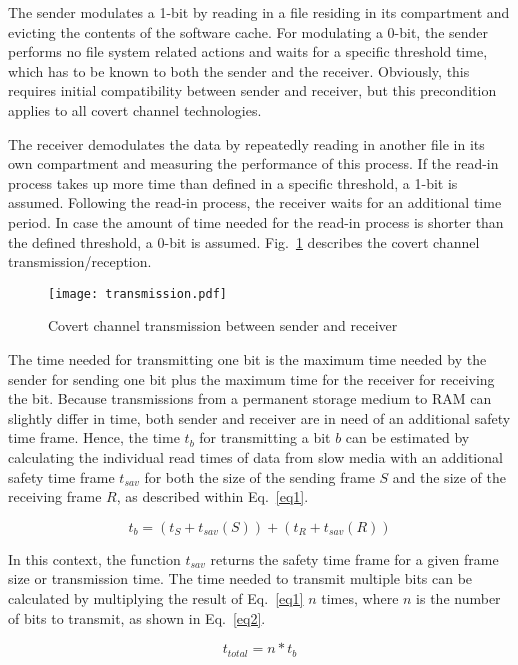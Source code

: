 \documentclass[runningheads,a4paper]{llncs}
\begin{document}
The sender modulates a 1-bit by reading in a file residing in its compartment and evicting the contents of the software cache.
For modulating a 0-bit, the sender performs no file system related actions and waits for a specific threshold time, which has to be known to both the sender and the receiver.
Obviously, this requires initial compatibility between sender and receiver, but this precondition applies to all covert channel technologies.

The receiver demodulates the data by repeatedly reading in another file in its own compartment and measuring the performance of this process.
If the read-in process takes up more time than defined in a specific threshold, a 1-bit is assumed.
Following the read-in process, the receiver waits for an additional time period.
In case the amount of time needed for the read-in process is shorter than the defined threshold, a 0-bit is assumed.
Fig.~\ref{transmission} describes the covert channel transmission/reception.

\begin{figure}[!ht]
\texttt{[image: transmission.pdf]}
\caption{Covert channel transmission between sender and receiver}
\label{transmission}
\end{figure}

The time needed for transmitting one bit is the maximum time needed by the sender for sending one bit plus the maximum time for the receiver for receiving the bit. 
Because transmissions from a permanent storage medium to RAM can slightly differ in time, both sender and receiver are in need of an additional safety time frame. 
Hence, the time $t_b$ for transmitting a bit $b$ can be estimated by calculating the individual read times of data from slow media with an additional safety time frame $t_{sav}$ for both the size of the sending frame $S$ and the size of the receiving frame $R$, as described within Eq.~\ref{eq1}.

\begin{equation}\label{eq1}
t_{b} = \left(t_{S}+t_{sav}(S)\right) + \left(t_{R}+t_{sav}(R)\right)
\end{equation}

In this context, the function $t_{sav}$ returns the safety time frame for a given frame size or transmission time.
The time needed to transmit multiple bits can be calculated by multiplying the result of Eq.~\ref{eq1} $n$ times, where $n$ is the number of bits to transmit, as shown in Eq.~\ref{eq2}.

\begin{equation}\label{eq2}
t_{total}=n * t_{b}
\end{equation}
\end{document}
